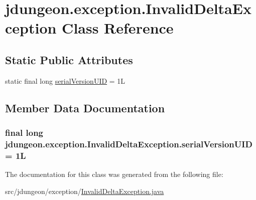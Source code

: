\hypertarget{classjdungeon_1_1exception_1_1_invalid_delta_exception}{
\section{jdungeon.exception.InvalidDeltaException Class Reference}
\label{classjdungeon_1_1exception_1_1_invalid_delta_exception}
}
\subsection*{Static Public Attributes}
\begin{DoxyCompactItemize}
\item 
static final long \hyperlink{classjdungeon_1_1exception_1_1_invalid_delta_exception_aec0b1316570a284832c45b37a363b2d0}{serialVersionUID} = 1L
\end{DoxyCompactItemize}


\subsection{Member Data Documentation}
\hypertarget{classjdungeon_1_1exception_1_1_invalid_delta_exception_aec0b1316570a284832c45b37a363b2d0}{
\subsubsection[{serialVersionUID}]{\setlength{\rightskip}{0pt plus 5cm}final long {\bf jdungeon.exception.InvalidDeltaException.serialVersionUID} = 1L}}
\label{classjdungeon_1_1exception_1_1_invalid_delta_exception_aec0b1316570a284832c45b37a363b2d0}


The documentation for this class was generated from the following file:\begin{DoxyCompactItemize}
\item 
src/jdungeon/exception/\hyperlink{jdungeon_2exception_2_invalid_delta_exception_8java}{InvalidDeltaException.java}\end{DoxyCompactItemize}
